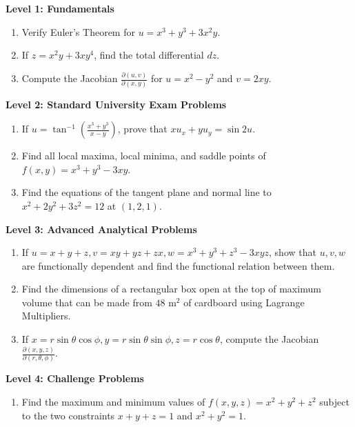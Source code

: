 \begin{practiceset}
\noindent\textbf{Level 1: Fundamentals}
\begin{enumerate}[leftmargin=1.5em]
    \item Verify Euler's Theorem for $u = x^3 + y^3 + 3x^2 y$.
    \item If $z = x^2 y + 3xy^4$, find the total differential $dz$.
    \item Compute the Jacobian $\frac{\partial(u,v)}{\partial(x,y)}$ for $u = x^2 - y^2$ and $v = 2xy$.
\end{enumerate}

\medskip
\noindent\textbf{Level 2: Standard University Exam Problems}
\begin{enumerate}[leftmargin=1.5em, start=4]
    \item If $u = \tan^{-1}\left(\frac{x^3+y^3}{x-y}\right)$, prove that $x u_x + y u_y = \sin 2u$.
    \item Find all local maxima, local minima, and saddle points of $f(x,y) = x^3 + y^3 - 3xy$.
    \item Find the equations of the tangent plane and normal line to $x^2 + 2y^2 + 3z^2 = 12$ at $(1, 2, 1)$.
\end{enumerate}

\medskip
\noindent\textbf{Level 3: Advanced Analytical Problems}
\begin{enumerate}[leftmargin=1.5em, start=7]
    \item If $u = x+y+z, v = xy+yz+zx, w = x^3+y^3+z^3-3xyz$, show that $u, v, w$ are functionally dependent and find the functional relation between them.
    \item Find the dimensions of a rectangular box open at the top of maximum volume that can be made from $48\text{ m}^2$ of cardboard using Lagrange Multipliers.
    \item If $x = r\sin\theta\cos\phi, y = r\sin\theta\sin\phi, z = r\cos\theta$, compute the Jacobian $\frac{\partial(x,y,z)}{\partial(r,\theta,\phi)}$.
\end{enumerate}

\medskip
\noindent\textbf{Level 4: Challenge Problems}
\begin{enumerate}[leftmargin=1.5em, start=10]
    \item Find the maximum and minimum values of $f(x,y,z) = x^2 + y^2 + z^2$ subject to the two constraints $x+y+z = 1$ and $x^2+y^2 = 1$.
\end{enumerate}
\end{practiceset}

